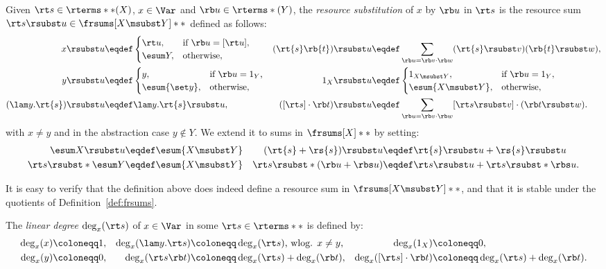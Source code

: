 \begin{definition} \label{def:rsubst}
	Given $\rt s \in \rterms**(X)$, $x \in \Var$ and $\rb u \in \rterms*(Y)$,
	the \emph{resource substitution} of $x$ by $\rb u$ in $\rt s$
	is the resource sum $\rt s \rsubst u \in \frsums[X \msubst Y]**$
	defined as follows:
	\begin{align*}
		x \rsubst u & \eqdef 
			\begin{cases}
			\rt u,& \text{if $\rb u = [\rt u]$},\\
			\esum Y, & \text{otherwise},
			\end{cases} &
		(\rt{s}\rb{t}) \rsubst u & \eqdef 
			\sum_{\rb u = \rb v \cdot \rb w}
			(\rt{s}\rsubst v)( \rb{t}\rsubst w),\\
		y  \rsubst u & \eqdef 
			\begin{cases}
			y, & \text{if $\rb u = 1_Y$,} \\
			\esum {\set y}, & \text{otherwise},
			\end{cases}&
		1_X \rsubst u & \eqdef 
			\begin{cases}
			1_{X \msubst Y}, & \text{if $\rb u = 1_Y$}, \\
			\esum {X \msubst Y}, & \text{otherwise,} \\
			\end{cases}\\
		(\lam y.\rt{s}) \rsubst u & \eqdef 
			\lam y.\rt{s} \rsubst u, &
		([\rt s] \cdot \rb t) \rsubst u & \eqdef
			\sum_{\rb u = \rb v \cdot \rb w}
			[\rt s \rsubst v] \cdot (\rb t \rsubst w).
	\end{align*}
	with $x \neq y$ and in the abstraction case $y \notin Y$.
	We extend it to sums in $\frsums[X]**$ by setting:
	\begin{align*}
		\esum X \rsubst u & \eqdef \esum {X\msubst Y} &
		(\rt{s} + \rs{s}) \rsubst u & \eqdef 
			\rt{s} \rsubst u + \rs{s} \rsubst u \\
		\rt s \rsubst* {\esum Y} & \eqdef \esum {X \msubst Y} &
		\rt s \rsubst* {(\rb u + \rbs u)} & \eqdef
			\rt s \rsubst u + \rt s \rsubst* {\rbs u}.
	\end{align*}
\end{definition}

It is easy to verify that the definition above does indeed define a resource sum in $\frsums[X \msubst Y]**$, and that it is stable under the quotients of Definition~\ref{def:frsums}.

\begin{definition}The \emph{linear degree} $\deg_x(\rt s)$ of $x \in \Var$
	in some $\rt s \in \rterms**$ is defined by:
	\begin{align*}
	\deg_x(x) & \coloneqq 1, &
	\deg_x(\lam y.\rt s) & \coloneqq \deg_x(\rt s)
		\text{, wlog. $x\neq y$,} &
	\deg_x(1_X) & \coloneqq 0, \\
	\deg_x(y) & \coloneqq 0 ,&
	\deg_x(\rt s \rb t) & \coloneqq \deg_x(\rt s) + \deg_x(\rb t), &
	\deg_x([\rt s] \cdot \rb t) & \coloneqq \deg_x(\rt s) + \deg_x(\rb t).
	\end{align*}

\end{definition}

